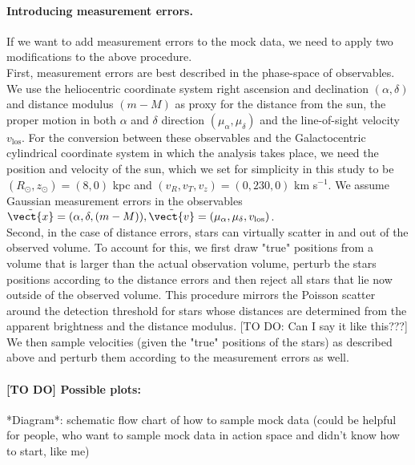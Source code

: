 \paragraph{Introducing measurement errors.} If we want to add measurement errors to the mock data, we need to apply two modifications to the above procedure.
\\First, measurement errors are best described in the phase-space of observables. We use the heliocentric coordinate system right ascension and declination $(\alpha,\delta)$ and distance modulus $(m-M)$ as proxy for the distance from the sun, the proper motion in both $\alpha$ and $\delta$ direction $(\mu_\alpha,\mu_\delta)$ and the line-of-sight velocity $v_\text{los}$. For the conversion between these observables and the Galactocentric cylindrical coordinate system in which the analysis takes place, we need the position and velocity of the sun, which we set for simplicity in this study to be $(R_\odot,z_\odot)=(8,0)$ kpc and $(v_R,v_T,v_z)=(0,230,0)$ km s$^{-1}$. We assume Gaussian measurement errors in the observables $\tilde{\vect{x}} = (\alpha,\delta,(m-M)), \tilde{\vect{v}} = (\mu_\alpha,\mu_\delta,v_\text{los})$.
\\Second, in the case of distance errors, stars can virtually scatter in and out of the observed volume. To account for this, we first draw "true" positions from a volume that is larger than the actual observation volume, perturb the stars positions according to the distance errors and then reject all stars that lie now outside of the observed volume. This procedure mirrors the Poisson scatter around the detection threshold for stars whose distances are determined from the apparent brightness and the distance modulus. [TO DO: Can I say it like this???] We then sample velocities (given the "true" positions of the stars) as described above and perturb them according to the measurement errors as well.

\paragraph{[TO DO] Possible plots:} *Diagram*: schematic flow chart of how to sample mock data (could be helpful for people, who want to sample mock data in action space and didn't know how to start, like me)

